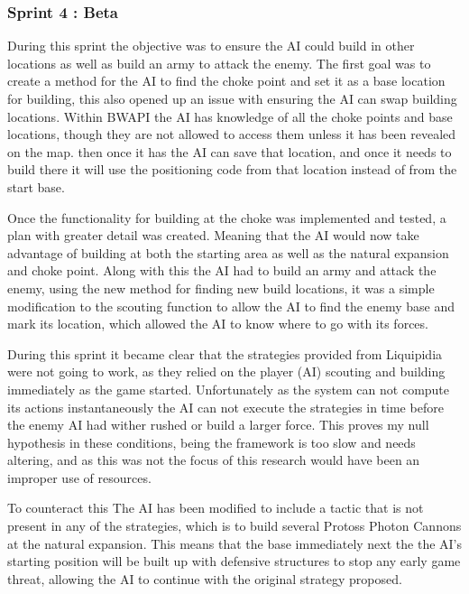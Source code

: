 \documentclass[journal]{IEEEtran}
\begin{document}
\subsubsection{Sprint 4 : Beta}
During this sprint the objective was to ensure the AI could build in other locations as well as build an army to attack the enemy. The first goal was to create a method for the AI to find the choke point and set it as a base location for building, this also opened up an issue with ensuring the AI can swap building locations. Within BWAPI the AI has knowledge of all the choke points and base locations, though they are not allowed to access them unless it has been revealed on the map. then once it has the AI can save that location, and once it needs to build there it will use the positioning code from that location instead of from the start base. 

Once the functionality for building at the choke was implemented and tested, a plan with greater detail was created. Meaning that the AI would now take advantage of building at both the starting area as well as the natural expansion and choke point. Along with this the AI had to build an army and attack the enemy, using the new method for finding new build locations, it was a simple modification to the scouting function to allow the AI to find the enemy base and mark its location, which allowed the AI to know where to go with its forces.

During this sprint it became clear that the strategies provided from Liquipidia were not going to work, as they relied on the player (AI) scouting and building immediately as the game started. Unfortunately as the system can not compute its actions instantaneously the AI can not execute the strategies in time before the enemy AI had wither rushed or build a larger force. This proves my null hypothesis in these conditions, being the framework is too slow and needs altering, and as this was not the focus of this research would have been an improper use of resources.

To counteract this The AI has been modified to include a tactic that is not present in any of the strategies, which is to build several Protoss Photon Cannons at the natural expansion. This means that the base immediately next the the AI's starting position will be built up with defensive structures to stop any early game threat, allowing the AI to continue with the original strategy proposed.
\newline
{}
\end{document}
